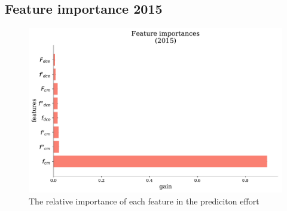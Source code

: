 \documentclass[a4paper]{article}
\begin{document}




\subsection{Feature importance 2015}\label{feature_imp2015}


\begin{figure}[!htb]
 	\centering
	\includegraphics[scale=0.47]{feature_imp_2015.pdf}
  \caption{\footnotesize{The relative importance of each feature in the prediciton effort}}
\end{figure}
\pagebreak
\end{document}
